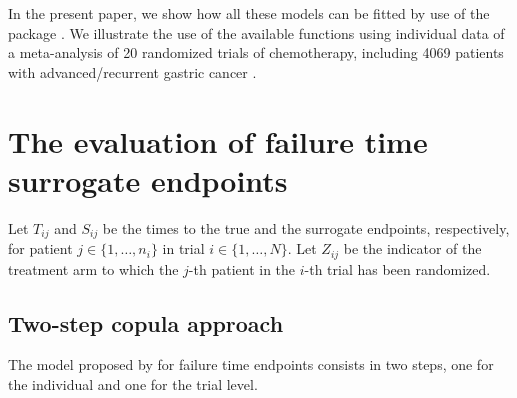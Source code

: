 \documentclass[article,shortnames, nojss]{jss}\usepackage[]{graphicx}\usepackage[]{color}
\begin{document}
In the present paper, we show how all these models can be fitted by use 
  of the  \citep{R}
  package  \citep{R:surrosurv}.
We illustrate the use of the available functions 
  using individual data of a meta-analysis of 20 randomized trials of chemotherapy,
  including 4069 patients with advanced/recurrent gastric cancer
  \citep{GASTRIC13, Paoletti2013}.


\section{The evaluation of failure time surrogate endpoints}
\label{sec:methods}

Let $T_{ij}$ and $S_{ij}$ be the times to the true and the surrogate 
  endpoints, respectively,
  for patient $j\in\{1, \ldots, n_i\}$
  in trial  $i\in\{1, \ldots, N\}$.
Let $Z_{ij}$ be the indicator of the treatment arm
  to which the $j$-th patient in the $i$-th trial has been randomized.


\subsection{Two-step copula approach}
\label{sec:copulaApp}
The model proposed by \cite{BurzykowskiEtal01} for failure time endpoints
  consists in two steps, one for the individual and one for the trial level.
\end{document}
